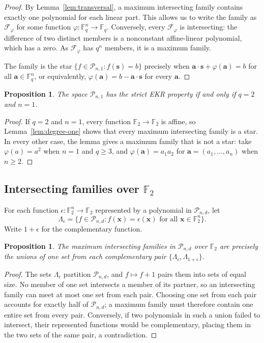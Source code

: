 \documentclass[12pt,reqno]{amsart}
\newtheorem{prop}[thm]{Proposition}
\theoremstyle{definition}
\newcommand{\F}{\mathbb{F}}
\newcommand{\cF}{\mathcal F}
\newcommand{\cP}{\mathcal P}
\begin{document}
\begin{proof}
By Lemma~\ref{lem:transversal}, a maximum intersecting family contains
exactly one polynomial for each linear part. This allows us to write 
the family as $\cF_\varphi$ for some function $\varphi\colon\F_q^n\to\F_q$. Conversely, every $\cF_\varphi$ is intersecting: the difference of two distinct members is a nonconstant
affine-linear polynomial, which has a zero. As $\cF_\varphi$ has $q^n$ members, it is a maximum family.

The family is the star $\{f \in \mathcal{P}_{n,1}: f(\mathbf s)=b\}$ precisely when $\mathbf a\cdot\mathbf s+\varphi(\mathbf a)=b$ for all $\mathbf a\in\F_q^n$, or equivalently, $\varphi(\mathbf a)=b-\mathbf a\cdot\mathbf s$ for every $\mathbf a$. 
\end{proof}

\begin{prop}\label{prop:degree-one}
The space $\cP_{n,1}$ has the strict EKR property if and only if
$q=2$ and $n=1$.
\end{prop}

\begin{proof}
If $q=2$ and $n=1$, every function $\F_2\to\F_2$ is affine, so
Lemma~\ref{lem:degree-one} shows that every maximum intersecting
family is a star. In every other case, the lemma gives a maximum
family that is not a star: take $\varphi(a)=a^2$ when $n=1$ and
$q\geq3$, and $\varphi(\mathbf a)=a_1a_2$ for
$\mathbf a=(a_1,\ldots,a_n)$ when $n\geq2$.
\end{proof}

\subsection{Intersecting families over \texorpdfstring{$\F_2$}{F2}}
\label{subsec:F2-pairwise}

For each function $\epsilon\colon\F_2^n\to\F_2$ represented by
a polynomial in $\cP_{n,d}$, let
\[
\Lambda_{\epsilon}=\{f\in\cP_{n,d}:f(\mathbf x)=\epsilon(\mathbf x)
\text{ for all }\mathbf x\in\F_2^n\}.
\]
Write $1+\epsilon$ for the complementary function.

\begin{prop}
\label{prop:F2-pairwise}
The maximum intersecting families in $\cP_{n,d}$ over $\F_2$ are
precisely the unions of one set from each complementary pair
$\{\Lambda_{\epsilon},
\Lambda_{1+\epsilon}\}$.
\end{prop}

\begin{proof}
The sets $\Lambda_{\epsilon}$ partition $\cP_{n,d}$, and
$f\mapsto f+1$ pairs them into sets of equal size. No member of one
set intersects a member of its partner, so an intersecting family can meet at most one set from each pair. Choosing one set from each pair accounts for exactly half of $\cP_{n,d}$; a maximum family must therefore contain one entire set from every pair. Conversely, if two polynomials in such a union failed to intersect, their represented functions would be complementary, placing them in the two sets of the same pair, a contradiction.
\end{proof}
\end{document}
